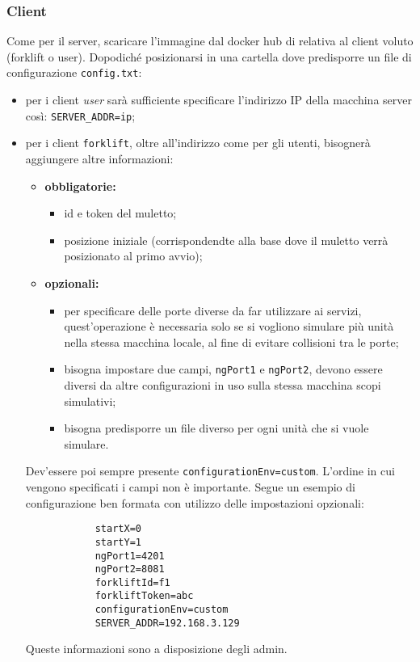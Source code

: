     \subsubsection{Client}
    Come per il server, scaricare l'immagine dal docker hub di \group{} relativa al client voluto (forklift o user). Dopodiché posizionarsi in una cartella dove predisporre un file di configurazione \texttt{config.txt}:
    \begin{itemize}
        \item per i client \textit{user} sarà sufficiente specificare l'indirizzo IP della macchina server così: \texttt{SERVER\_ADDR=ip};
        \item per i client \texttt{forklift}, oltre all'indirizzo come per gli utenti, bisognerà aggiungere altre informazioni:
        \begin{itemize}
            \item \textbf{obbligatorie: }
            \begin{itemize}
                \item id e token del muletto;
                \item posizione iniziale (corrispondendte alla base dove il muletto verrà posizionato al primo avvio);
            \end{itemize}
            \item \textbf{opzionali: }
            \begin{itemize}
                \item per specificare delle porte diverse da far utilizzare ai servizi, quest'operazione è necessaria solo se si vogliono simulare più unità nella stessa macchina locale, al fine di evitare collisioni tra le porte;
                \item bisogna impostare due campi, \texttt{ngPort1} e \texttt{ngPort2}, devono essere diversi da altre configurazioni in uso sulla stessa macchina scopi simulativi;
                \item bisogna predisporre un file diverso per ogni unità che si vuole simulare.
            \end{itemize}
        \end{itemize}
        Dev'essere poi sempre presente \texttt{configurationEnv=custom}. L'ordine in cui vengono specificati i campi non è importante. Segue un esempio di configurazione ben formata con utilizzo delle impostazioni opzionali:
        \begin{verbatim}
            startX=0
            startY=1
            ngPort1=4201
            ngPort2=8081
            forkliftId=f1
            forkliftToken=abc
            configurationEnv=custom
            SERVER_ADDR=192.168.3.129
        \end{verbatim}
        Queste informazioni sono a disposizione degli admin.
    \end{itemize}

